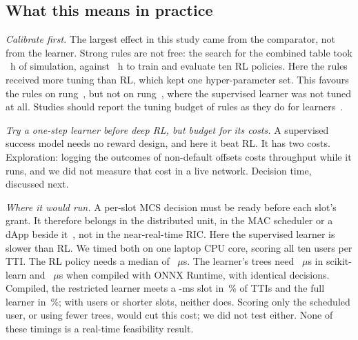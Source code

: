 \subsection{What this means in practice}\label{sec:calfirst}
\emph{Calibrate first.} The largest effect in this study came from the comparator, not from the learner. Strong rules are not free: the search for the combined table took \NGsixSearchHours~h of simulation, against \NMoneHours~h to train and evaluate ten RL policies. Here the rules received more tuning than RL, which kept one hyper-parameter set. This favours the rules on rung~, but not on rung~, where the supervised learner was not tuned at all. Studies should report the tuning budget of rules as they do for learners~\cite{ferraridacrema2019progress}.

\emph{Try a one-step learner before deep RL, but budget for its costs.} A supervised success model needs no reward design, and here it beat RL. It has two costs. Exploration: logging the outcomes of non-default offsets costs throughput while it runs, and we did not measure that cost in a live network. Decision time, discussed next.

\emph{Where it would run.} A per-slot MCS decision must be ready before each slot's grant. It therefore belongs in the distributed unit, in the MAC scheduler or a dApp beside it~\cite{doro2022dapps,wang2026lolla}, not in the near-real-time RIC. Here the supervised learner is slower than RL. We timed both on one laptop CPU core, scoring all ten users per TTI. The RL policy needs a median of \NTgbtRlMed~$\mu$s. The learner's  trees need \NTgbtSkResMed~$\mu$s in scikit-learn and \NTgbtOnnxResMed~$\mu$s when compiled with ONNX Runtime, with identical decisions. Compiled, the restricted learner meets a -ms slot in \NTgbtOnnxResSlot\,\% of TTIs and the full learner in \NTgbtOnnxFullSlot\,\%; with  users or shorter slots, neither does. Scoring only the scheduled user, or using fewer trees, would cut this cost; we did not test either. None of these timings is a real-time feasibility result.

